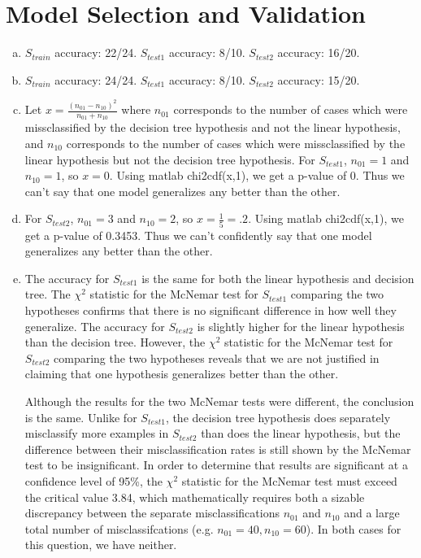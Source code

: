 \documentclass{article}
\begin{document}
\thispagestyle{fancy}

\section{Model Selection and Validation}

\begin{enumerate}[(a)]
\item $S_{train}$ accuracy: 22/24. $S_{test1}$ accuracy: 8/10. $S_{test2}$ accuracy: 16/20. 
\item $S_{train}$ accuracy: 24/24. $S_{test1}$ accuracy: 8/10. $S_{test2}$ accuracy: 15/20. 
\item Let $x=\frac{(n_{01}-n_{10})^2}{n_{01}+n_{10}}$ where $n_{01}$ corresponds to the number of cases which were missclassified by the decision tree hypothesis and not the linear hypothesis, and $n_{10}$ corresponds to the number of cases which were missclassified by the linear hypothesis but not the decision tree hypothesis. For $S_{test1}$, $n_{01}=1$ and $n_{10}=1$, so $x=0$. Using matlab chi2cdf(x,1), we get a p-value of 0. Thus we can't say that one model generalizes any better than the other.
\item For $S_{test2}$, $n_{01}=3$ and $n_{10}=2$, so $x=\frac{1}{5}=.2$. Using matlab chi2cdf(x,1), we get a p-value of 0.3453. Thus we can't confidently say that one model generalizes any better than the other.
\item The accuracy for $S_{test1}$ is the same for both the linear hypothesis and decision tree. The $\chi^2$ statistic for the McNemar test for $S_{test1}$ comparing the two hypotheses confirms that there is no significant difference in how well they generalize. The accuracy for $S_{test2}$ is slightly higher for the linear hypothesis than the decision tree. However, the $\chi^2$ statistic for the McNemar test for $S_{test2}$ comparing the two hypotheses reveals that we are not justified in claiming that one hypothesis generalizes better than the other. 

Although the results for the two McNemar tests were different, the conclusion is the same. Unlike for $S_{test1}$, the decision tree hypothesis does separately misclassify more examples in $S_{test2}$ than does the linear hypothesis, but the difference between their misclassification rates is still shown by the McNemar test to be insignificant. In order to determine that results are significant at a confidence level of 95\%, the $\chi^2$ statistic for the McNemar test must exceed the critical value 3.84, which mathematically requires both a sizable discrepancy between the separate misclassifications $n_{01}$ and $n_{10}$ and a large total number of misclassifcations (e.g. $n_{01}=40,n_{10}=60$). In both cases for this question, we have neither.  %



\end{enumerate}
\end{document}

